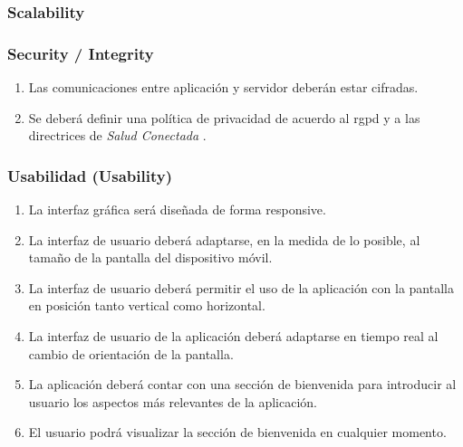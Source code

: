         \subsubsection{Scalability}
        \subsubsection{Security / Integrity}
            \begin{enumerate}[resume, label=\textbf{\texttt{RNF-\arabic*}}]
                \item Las comunicaciones entre aplicación y servidor deberán estar cifradas.
                \item Se deberá definir una política de privacidad de acuerdo al \gls{rgpd} \cite{publications_office_of_the_european_union_reglamento_nodate} y a las directrices de \textit{Salud Conectada} \cite{google_preguntas_nodate}.
            \end{enumerate}
        \subsubsection{Usabilidad (Usability)}
            \begin{enumerate}[resume, label=\textbf{\texttt{RNF-\arabic*}}]
                \item La interfaz gráfica será diseñada de forma \gls{responsive}.
                \item La interfaz de usuario deberá adaptarse, en la medida de lo posible, al tamaño de la pantalla del dispositivo móvil.
                \item La interfaz de usuario deberá permitir el uso de la aplicación con la pantalla en posición tanto vertical como horizontal.
                \item La interfaz de usuario de la aplicación deberá adaptarse en tiempo real al cambio de orientación de la pantalla.
                \item La aplicación deberá contar con una sección de bienvenida para introducir al usuario los aspectos más relevantes de la aplicación.
                \item El usuario podrá visualizar la sección de bienvenida en cualquier momento.
            \end{enumerate}
            
